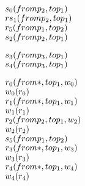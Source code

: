 \newsavebox{\readyOne}
\begin{lrbox}{\readyOne}
\begin{minipage}[t]{0.6\linewidth}
\large
\begin{alltt}
\(s\sb{0}(from p\sb{2}, to p\sb{1})\)
\(rs\sb{1}(from p\sb{2}, to p\sb{1})\)
\(r\sb{5}(from p\sb{1}, to p\sb{2})\)
\(s\sb{2}(from p\sb{2}, to p\sb{1})\)
\end{alltt}
\end{minipage}
\end{lrbox}

\newsavebox{\readyTwo}
\begin{lrbox}{\readyTwo}
\begin{minipage}[t]{0.6\linewidth}
\large
\begin{alltt}
\(s\sb{3}(from p\sb{3}, to p\sb{1})\)
\(s\sb{4}(from p\sb{3}, to p\sb{1})\)
\end{alltt}
\end{minipage}
\end{lrbox}


\newcommand\readyexample{
\begin{figure*}[tb]
\begin{center}
\setlength{\tabcolsep}{2pt}
\begin{tabular}[t]{c|c|c}
$\mathit{p_1}$ & $\mathit{p_2}$ & $\mathit{p_3}$ \\
\hline
\scalebox{0.8}{\usebox{\readyZero}}&
\scalebox{0.8}{\usebox{\readyOne}} &
\scalebox{0.8}{\usebox{\readyTwo}}
\end{tabular}
\end{center}
\caption{A simple concurrent trace program with ready send.}
\label{fig:readyexample}
\end{figure*}
}






\newsavebox{\boxTZero}
\begin{lrbox}{\boxTZero}
\begin{minipage}[t]{0.6\linewidth}
\large
\begin{alltt}
\(r\sb{0}(from \ast, to p\sb{1}, w\sb{0})\)
\(w\sb{0}(r\sb{0})\)
\(r\sb{1}(from \ast, to p\sb{1}, w\sb{1})\)
\(w\sb{1}(r\sb{1})\)
\(r\sb{2}(from p\sb{2}, to p\sb{1}, w\sb{2})\)
\(w\sb{2}(r\sb{2})\)
\(s\sb{5}(from p\sb{1}, to p\sb{2})\)
\(r\sb{3}(from \ast, to p\sb{1}, w\sb{3})\)
\(w\sb{3}(r\sb{3})\)
\(r\sb{4}(from \ast, to p\sb{1}, w\sb{4})\)
\(w\sb{4}(r\sb{4})\)
\end{alltt}
\end{minipage}
\end{lrbox}

